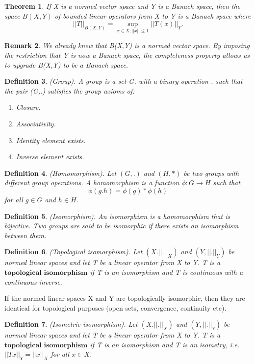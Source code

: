 \documentclass[twoside]{article}
\newcounter{lecnum}
\newtheorem{theorem}{Theorem}[lecnum]
\newtheorem{definition}[theorem]{Definition}
\newtheorem{remark}[theorem]{Remark}
\begin{document}
\begin{theorem}If X is a normed vector space and Y is a Banach space, then the space $B(X,Y)$ of bounded linear operators from X to Y is a Banach space where 
$$
||T||_{B(X,Y)} = \sup_{x \in X; ||x|| \leq 1}||T(x)||_Y.
$$
\end{theorem}
\begin{remark}We already knew that B(X,Y) is a normed vector space. By imposing the restriction that Y is now a Banach space, the completeness property allows us to upgrade B(X,Y) to be a Banach space.
\end{remark}


\begin{definition}(Group). A group is a set G, with a binary operation . such that the pair (G,.) satisfies the group axioms of:
\begin{enumerate}
\item Closure.
\item Associativity.
\item Identity element exists.
\item Inverse element exists.
\end{enumerate}
\end{definition}

\begin{definition}(Homomorphism). Let $(G, .)$ and $(H, *)$ be two groups with different group operations. A homomorphism is a function $\phi: G \rightarrow H$ such that
$$
\phi(g . h) = \phi(g) * \phi(h)
$$
for all $g \in G$ and $h \in H$.
\end{definition}

\begin{definition}(Isomorphism). An isomorphism is a homomorphism that is bijective. Two groups are said to be isomorphic if there exists an isomorphism between them.
\end{definition}

\begin{definition}(Topological isomorphism). Let $(X. ||.||_X)$ and $(Y, ||.||_Y)$ be normed linear spaces and let T be a linear operator from X to Y. T is a $\textbf{topological isomorphism}$ if T is an isomorphism and T is continuous with a continuous inverse.
\end{definition}

If the normed linear spaces X and Y are topologically isomorphic, then they are identical for topological purposes (open sets, convergence, continuity etc).

\begin{definition}(Isometric isomorphism). Let $(X. ||.||_X)$ and $(Y, ||.||_Y)$ be normed linear spaces and let T be a linear operator from X to Y. T is a $\textbf{topological isomorphism}$ if T is an isomorphism and T is an isometry, i.e. $||Tx||_Y = ||x||_X$ for all $x \in X$.
\end{definition}
\end{document}
